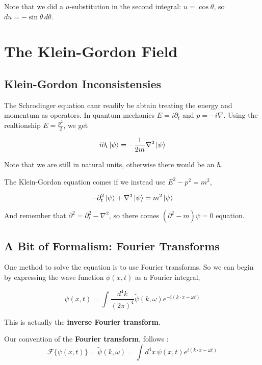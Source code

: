 Note that we did a $u$-substitution in the second integral: $u = \cos\theta$, so $du = -\sin\theta \, d\theta$.








\section{The Klein-Gordon Field}

\subsection{Klein-Gordon Inconsistensies}

The Schrodinger equation canr readily be abtain treating the energy and momentum as operators.
In quantum mechanics $E = i\partial_t$ and $p = -i\nabla$.
Using the realtionship $E = \frac{p^2}{2}$, we get


$$
i\partial_t \ket{\psi} = -\frac{1}{2m} \nabla^2 \ket{\psi}
$$

Note that we are still in natural units, otherwise there would be an $\hbar$.

The Klein-Gordon equation comes if we instead use $E^2 - p^2 = m^2$,

$$
-\partial_{t}^2 \ket{\psi} + \nabla^2 \ket{\psi} = m^2 \ket{\psi}
$$

And remember that $\partial^2 = \partial_{t}^{2} - \nabla^2$, so there comes $(\partial^2 - m)\psi = 0$ equation.



\subsection{A Bit of Formalism: Fourier Transforms} \label{formalism:fourier-properties}

One method to solve the equation is to use Fourier transforms.
So we can begin by expressing the wave function $\phi(x,t)$ as a Fourier integral,

$$
\psi(x, t) =
\int \frac{d^4k}{\left(2\pi\right)^4} \tilde{\psi}(k, \omega) e^{-i(k\cdot x - \omega t)}
$$

This is actually the \textbf{inverse Fourier transform}.

Our convention of the \textbf{Fourier transform}, follows \cite{peskin-and-schroeder}:
$$
\mathcal{F} \{ \psi(x, t) \} =
\tilde{ \psi }(k, \omega) =
\int d^4x \, \psi(x, t) e^{i(k\cdot x - \omega t)}
$$


